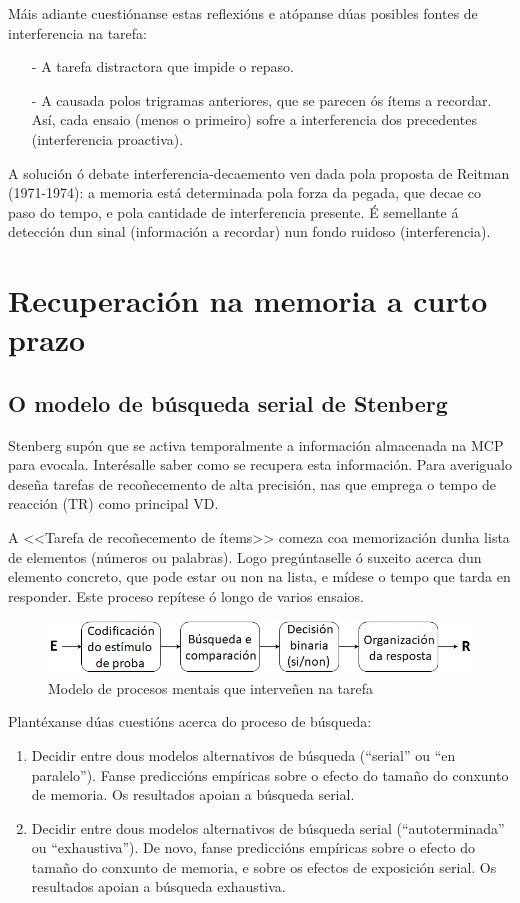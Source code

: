 \documentclass[a4paper,11pt]{article}
\begin{document}
Máis adiante cuestiónanse estas reflexións e atópanse dúas posibles fontes de interferencia na tarefa:
\begin{itemize}
	\item[-] A tarefa distractora que impide o repaso.
	\item[-] A causada polos trigramas anteriores, que se parecen ós ítems a recordar. Así, cada
	ensaio (menos o primeiro) sofre a interferencia dos precedentes (interferencia proactiva).
\end{itemize}

A solución ó debate interferencia-decaemento ven dada pola proposta de Reitman (1971-1974): a memoria está determinada pola forza da pegada, que decae co paso do tempo, e pola cantidade de interferencia presente. É semellante á detección dun sinal (información a recordar) nun fondo ruidoso (interferencia). 

\section{Recuperación na memoria a curto prazo}
\subsection{O modelo de búsqueda serial de Stenberg}
Stenberg supón que se activa temporalmente a información almacenada na MCP para evocala. Interésalle saber como se recupera esta información. Para averigualo deseña tarefas de recoñecemento de alta precisión, nas que emprega o tempo de reacción (TR) como principal VD. 

A <<Tarefa de recoñecemento de ítems>> comeza coa memorización dunha lista de elementos (números ou palabras). Logo pregúntaselle ó suxeito acerca dun elemento concreto, que pode estar ou non na lista, e mídese o tempo que tarda en responder. Este proceso repítese ó longo de varios ensaios.

\begin{figure}[h!]
	\centering
	\includegraphics[width=0.58\linewidth]{memoria2_2}
	\caption{Modelo de procesos mentais que interveñen na tarefa}
\end{figure}

Plantéxanse dúas cuestións acerca do proceso de búsqueda:
\begin{enumerate}
	\item Decidir entre dous modelos alternativos de búsqueda (``serial'' ou ``en paralelo'').
	Fanse prediccións empíricas sobre o efecto do tamaño do conxunto de memoria. Os resultados apoian
	a búsqueda serial.
	\item Decidir entre dous modelos alternativos de búsqueda serial (``autoterminada'' ou
	``exhaustiva''). De novo, fanse prediccións empíricas sobre o efecto do tamaño do conxunto de 			memoria, e sobre os efectos de exposición serial. Os resultados apoian a búsqueda exhaustiva.
\end{enumerate}
\end{document}
